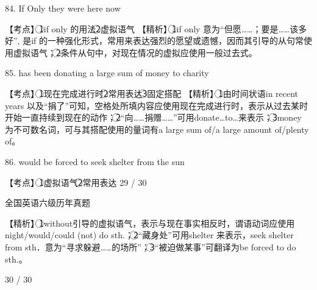 \documentclass[UTF8,11pt]{ctexart}
\begin{document}
84. If Only they were here now


【考点】\textcircled{1}if only 的用法\textcircled{2}虚拟语气 【精析】\textcircled{1}if only 意为“但愿……；要是……该多好”, 是if 的一种强化形式，常用来表达强烈的愿望或遗憾，因而其引导的从句常使用虚拟语气；\textcircled{2}条件从句中，对现在情况的虚拟应使用一般过去式。


85. has been donating a large sum of money to charity


【考点】\textcircled{1}现在完成进行时\textcircled{2}常用表达\textcircled{3}固定搭配 【精析】\textcircled{1}由时间状语in recent years 以及“捐了”可知，空格处所填内容应使用现在完成进行时，表示从过去某时开始一直持续到现在的动作；\textcircled{2}“向……捐赠……”可用donate…to…来表示；\textcircled{3}money 为不可数名词，可与其搭配使用的量词有a large sum of/a large amount of/plenty of。


86. would be forced to seek shelter from the sun


【考点】\textcircled{1}虚拟语气\textcircled{2}常用表达 29 / 30


全国英语六级历年真题


【精析】\textcircled{1}without引导的虚拟语气，表示与现在事实相反时，谓语动词应使用night/would/could (not) do sth.；\textcircled{2}“藏身处”可用shelter 来表示，seek shelter from sth．意为“寻求躲避……的场所”；\textcircled{3}“被迫做某事”可翻译为be forced to do sth.。


30 / 30
\end{document}
